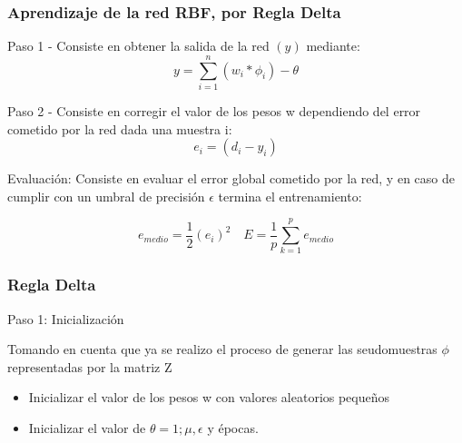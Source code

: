 \documentclass[
	11pt, %
]{beamer}
\begin{document}
\begin{frame}
  \frametitle{Aprendizaje de la red RBF, por Regla Delta}

  Paso 1 - Consiste en obtener la salida de la red $(y)$ mediante:\\

  \[ y = \sum_{i=1} ^{n} (w_{i}*\phi_{i}) - \theta\]

  Paso 2 - Consiste en corregir el valor de los pesos w dependiendo del error cometido por la red dada una muestra i:
  \[e_{i} = (d_{i}-y_{i})\]

  Evaluación: Consiste en evaluar el error global cometido por la red, y en caso de cumplir con un umbral de precisión $\epsilon$ termina el entrenamiento:

  \[e_{medio}=\frac{1}{2}(e_{i})^{2} \quad E=\frac{1}{p} \sum_{k=1} ^{p} e_{medio}\]
  
\end{frame}

\begin{frame}
  \frametitle{Regla Delta}

  Paso 1: Inicialización
  
  \bigskip %

  Tomando en cuenta que ya se realizo el proceso de generar las seudomuestras $\phi$ representadas por la matriz Z

  \bigskip %
  
  \begin{itemize}
  \item Inicializar el valor de los pesos w con valores aleatorios pequeños
    
    \bigskip %

  \item Inicializar el valor de $\theta = 1;\mu,\epsilon$ y épocas. 
  \end{itemize}\\
\end{frame}
\end{document}
